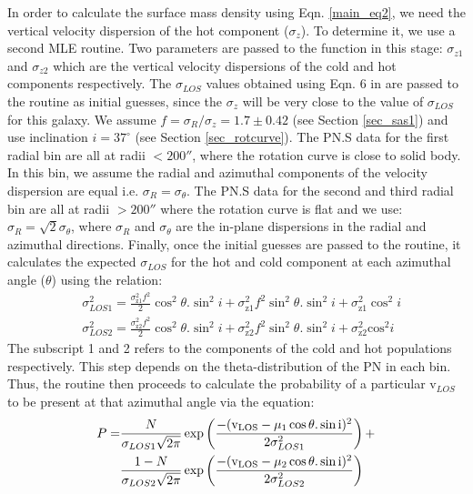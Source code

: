 \documentclass[fleqn,usenatbib]{mnras}
\begin{document}
In order to calculate the surface mass density using Eqn. \ref{main_eq2}, we need the vertical velocity dispersion of the hot component ($\sigma_{z}$). To determine it, we use a second MLE routine. Two parameters are passed to the function in this stage: $\sigma_{z1}$ and $\sigma_{z2}$ which are the vertical velocity dispersions of the cold and hot components respectively. The $\sigma_{LOS}$ values obtained using Eqn. 6 in   are passed to the routine as initial guesses, since the $\sigma_z$ will be very close to the value of $\sigma_{LOS}$ for this galaxy. We assume $f = \sigma_R / \sigma_z = 1.7\pm 0.42$ (see Section \ref{sec_sas1}) and use inclination $i = 37^\circ$ (see Section \ref{sec_rotcurve}). The PN.S data for the first radial bin are all at radii $< 200''$, where the rotation curve is close to solid body. In this bin, we assume the radial and azimuthal components of the velocity dispersion are equal i.e. $\sigma_R = \sigma_\theta$. The PN.S data for the second and third radial bin are all at radii $> 200''$ where the rotation curve is flat and we use: $\sigma_R = \sqrt{2}\sigma_\theta$, where $\sigma_R$ and $\sigma_\theta$ are the in-plane dispersions in the radial and azimuthal directions. 
Finally, once the initial guesses are passed to the routine, it calculates the expected $\sigma_{LOS}$ for the hot and cold component at each azimuthal angle ($\theta$) using the relation:
\begin{equation*}
\begin{split}
&\sigma_{LOS1}^2 = \frac{\sigma_{\text{z1}}^2f^2}{2} \cos^2\theta . \sin^2 i 
			    + \sigma_{\text{z1}}^2f^2 \sin^2\theta . \sin^2 i + \sigma_{\text{z1}}^2 \cos^2 i\\
&\sigma_{LOS2}^2 = \frac{\sigma_{\text{z2}}^2f^2}{2} \cos^2\theta . \sin^2 i 
			    + \sigma_{\text{z2}}^2f^2 \sin^2\theta . \sin^2 i + \sigma_{\text{z2}}^2 \text{cos}^2 i
\end{split}
\end{equation*}
The subscript 1 and 2 refers to the components of the cold and hot populations respectively. This step depends on the theta-distribution of the PN in each bin. Thus, the routine then proceeds to calculate the probability of a particular v$_{LOS}$ to be present at that azimuthal angle via the equation:
\begin{equation}
\begin{split}
P =  & \frac{N}{\sigma_{LOS1}\sqrt{2\pi}}\exp\left(\frac{-(\rm v_{LOS} - \mu_1 \cos \theta . \sin i)^2}{2\sigma_{LOS1}^2}\right ) + \\
& \frac{1-N}{\sigma_{LOS2}\sqrt{2\pi}}\exp\left (\frac{-(\rm v_{LOS} - \mu_2 \cos\theta . \sin i)^2}{2\sigma_{LOS2}^2}\right )
\end{split}
\label{sigdist}
\end{equation}
\end{document}
